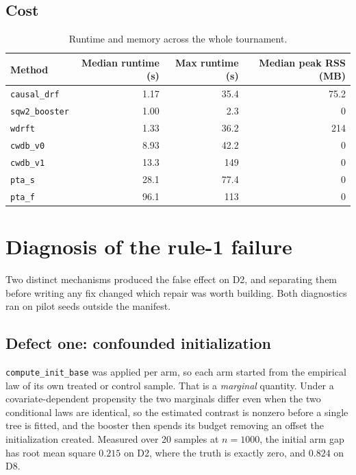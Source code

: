 \documentclass[11pt,a4paper]{article}
\theoremstyle{definition}
\theoremstyle{remark}
\begin{document}
\subsection{Cost}

\begin{table}[htbp]
\centering
\caption{Runtime and memory across the whole tournament.}
\label{tab:cost}
\small
\begin{tabular}{@{}lrrr@{}}
\toprule
Method & Median runtime (s) & Max runtime (s) & Median peak RSS (MB) \\
\midrule
\texttt{causal\_drf} & 1.17 & 35.4 & 75.2 \\
\texttt{sqw2\_booster} & 1.00 & 2.3 & 0 \\
\texttt{wdrft} & 1.33 & 36.2 & 214 \\
\texttt{cwdb\_v0} & 8.93 & 42.2 & 0 \\
\texttt{cwdb\_v1} & 13.3 & 149 & 0 \\
\texttt{pta\_s} & 28.1 & 77.4 & 0 \\
\texttt{pta\_f} & 96.1 & 113 & 0 \\
\bottomrule
\end{tabular}
\end{table}

\section{Diagnosis of the rule-1 failure}
\label{sec:diagnosis}

Two distinct mechanisms produced the false effect on D2, and separating them
before writing any fix changed which repair was worth building. Both diagnostics
ran on pilot seeds outside the manifest.

\subsection{Defect one: confounded initialization}

\texttt{compute\_init\_base} was applied per arm, so each arm started from the
empirical law of its own treated or control sample. That is a \emph{marginal}
quantity. Under a covariate-dependent propensity the two marginals differ even
when the two conditional laws are identical, so the estimated contrast is nonzero
before a single tree is fitted, and the booster then spends its budget removing an
offset the initialization created. Measured over 20 samples at $n = 1000$, the
initial arm gap has root mean square $0.215$ on D2, where the truth is exactly
zero, and $0.824$ on D8.
\end{document}
